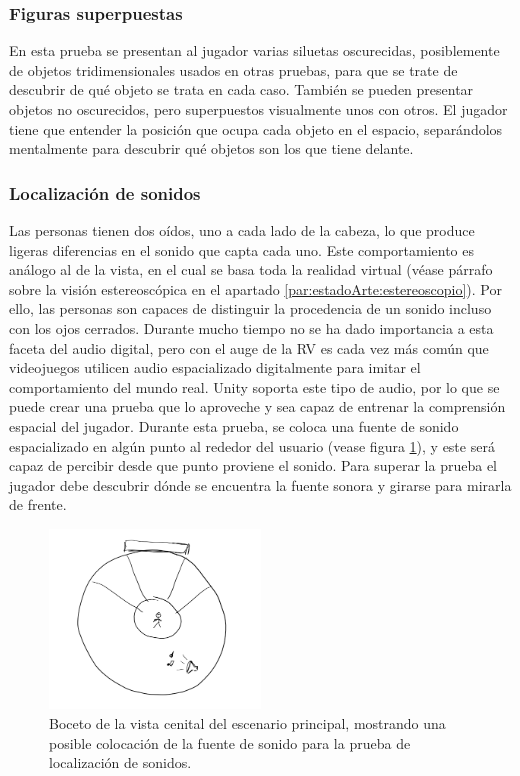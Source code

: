\subsubsection{Figuras superpuestas}

En esta prueba se presentan al jugador varias siluetas oscurecidas, posiblemente de objetos tridimensionales usados en otras pruebas, para que se trate de descubrir de qué objeto se trata en cada caso. También se pueden presentar objetos no oscurecidos, pero superpuestos visualmente unos con otros. El jugador tiene que entender la posición que ocupa cada objeto en el espacio, separándolos mentalmente para descubrir qué objetos son los que tiene delante.


\subsubsection{Localización de sonidos}


Las personas tienen dos oídos, uno a cada lado de la cabeza, lo que produce ligeras diferencias en el sonido que capta cada uno. Este comportamiento es análogo al de la vista, en el cual se basa toda la realidad virtual (véase párrafo sobre la visión estereoscópica en el apartado \ref{par:estadoArte:estereoscopio}). Por ello, las personas son capaces de distinguir la procedencia de un sonido incluso con los ojos cerrados. Durante mucho tiempo no se ha dado importancia a esta faceta del audio digital, pero con el auge de la RV es cada vez más común que videojuegos utilicen audio espacializado digitalmente para imitar el comportamiento del mundo real. Unity soporta este tipo de audio, por lo que se puede crear una prueba que lo aproveche y sea capaz de entrenar la comprensión espacial del jugador. Durante esta prueba, se coloca una fuente de sonido espacializado en algún punto al rededor del usuario (vease figura \ref{fig:AI_localizacionSonido}), y este será capaz de percibir desde que punto proviene el sonido. Para superar la prueba el jugador debe descubrir dónde se encuentra la fuente sonora y girarse para mirarla de frente.

\begin{figure}
  \centering
    \includegraphics[width=0.5\textwidth]{03.EstudioProblema/02.AnalisisInicial/00.Figuras/05.localizacion_sonido.png}
    \caption{Boceto de la vista cenital del escenario principal, mostrando una posible colocación de la fuente de sonido para la prueba de localización de sonidos.}
    \label{fig:AI_localizacionSonido}
\end{figure}

